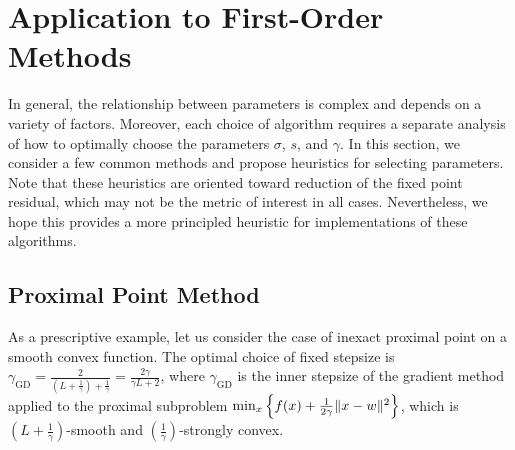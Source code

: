 \documentclass[11pt]{article}
\begin{document}
\section{Application to First-Order Methods}
In general, the relationship between parameters is complex and depends on a variety of factors.
Moreover, each choice of algorithm requires a separate analysis of how to optimally choose the parameters $\sigma$, $s$, and $\gamma$.
In this section, we consider a few common methods and propose heuristics for selecting parameters.
Note that these heuristics are oriented toward reduction of the fixed point residual, which may not be the metric of interest in all cases.
Nevertheless, we hope this provides a more principled heuristic for implementations of these algorithms.

\subsection{Proximal Point Method}
As a prescriptive example, let us consider the case of inexact proximal point on a smooth convex function.
The optimal choice of fixed stepsize is $\gamma_{\mathrm{GD}} = \frac{2}{(L + \frac{1}{\gamma}) + \frac{1}{\gamma}} = \frac{2\gamma}{\gamma L + 2}$, where $\gamma_{\mathrm{GD}}$ is the inner stepsize of the gradient method applied to the proximal subproblem $\min_x \left\{ f(x) + \frac{1}{2\gamma}\lVert x - w\rVert^2 \right\}$, which is $(L+\frac{1}{\gamma})$-smooth and $(\frac{1}{\gamma})$-strongly convex.
\end{document}
